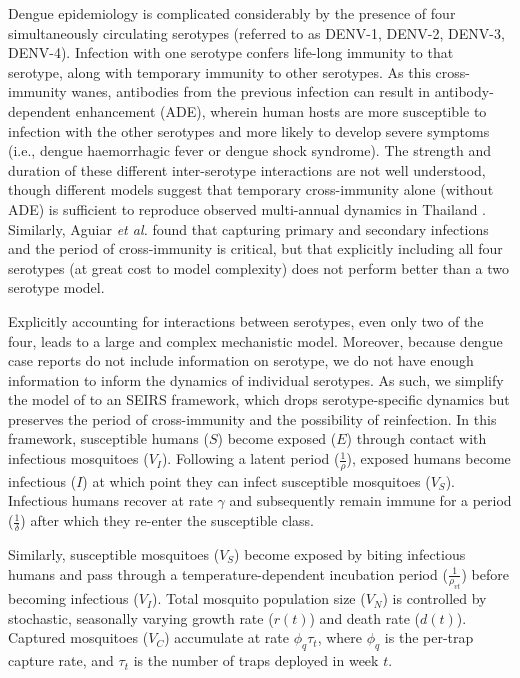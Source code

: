 \documentclass[10pt,letterpaper]{article}
\begin{document}
Dengue epidemiology is complicated considerably by the presence of four simultaneously circulating serotypes (referred to as DENV-1, DENV-2, DENV-3, DENV-4).
Infection with one serotype confers life-long immunity to that serotype, along with temporary immunity to other serotypes.  
As this cross-immunity wanes, antibodies from the previous infection can result in antibody-dependent enhancement (ADE), wherein human hosts are more susceptible to infection with the other serotypes and more likely to develop severe symptoms (i.e., dengue haemorrhagic fever or dengue shock syndrome).
The strength and duration of these different inter-serotype interactions are not well understood, though different models suggest that temporary cross-immunity alone (without ADE) is sufficient to reproduce observed multi-annual dynamics in Thailand \cite{Wearing2006,Reich2013}.
Similarly, Aguiar \emph{et al.} \cite{Aguiar2013} found that capturing primary and secondary infections and the period of cross-immunity is critical, but that explicitly including all four serotypes (at great cost to model complexity) does not perform better than a two serotype model.

Explicitly accounting for interactions between serotypes, even only two of the four, leads to a large and complex mechanistic model.
Moreover, because dengue case reports do not include information on serotype, we do not have enough information to inform the dynamics of individual serotypes.
As such, we simplify the model of \cite{Wearing2006} to an SEIRS framework, which drops serotype-specific dynamics but preserves the period of cross-immunity and the possibility of reinfection.
In this framework, susceptible humans ($S$) become exposed ($E$) through contact with infectious mosquitoes ($V_I$).
Following a latent period ($\frac{1}{\rho}$), exposed humans become infectious ($I$) at which point they can infect susceptible mosquitoes ($V_S$).
Infectious humans recover at rate $\gamma$ and subsequently remain immune for a period ($\frac{1}{\delta}$) after which they re-enter the susceptible class.

Similarly, susceptible mosquitoes ($V_S$) become exposed by biting infectious humans and pass through a temperature-dependent incubation period ($\frac{1}{\rho_{vt}}$) before becoming infectious ($V_I$).
Total mosquito population size ($V_N$) is controlled by stochastic, seasonally varying growth rate ($r(t)$) and death rate ($d(t)$).
Captured mosquitoes ($V_C$) accumulate at rate $\phi_q \tau_t$, where $\phi_q$ is the per-trap capture rate, and $\tau_t$ is the number of traps deployed in week $t$.
\end{document}
